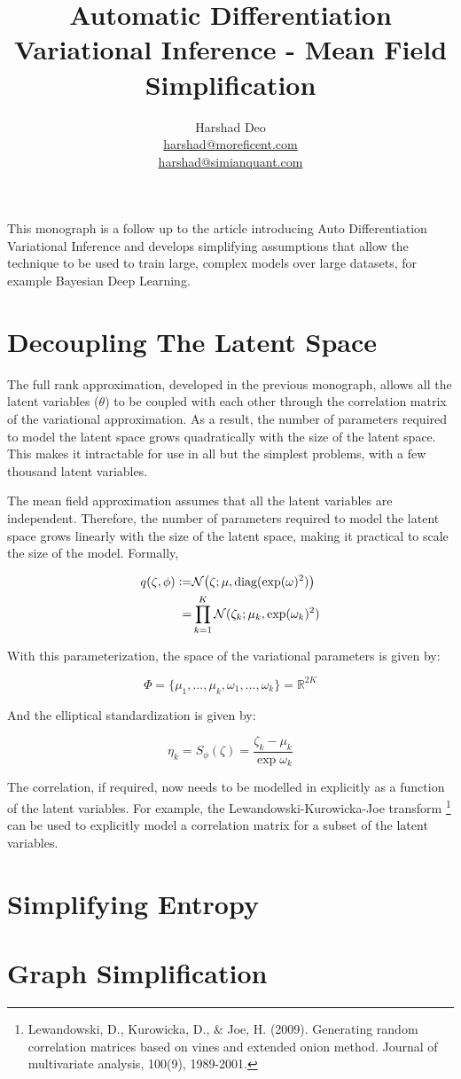 \documentclass[10pt]{article}
\title{Automatic Differentiation Variational Inference - Mean Field Simplification}
\author{Harshad Deo \\ 
  \href{mailto:harshad@moreficent.com}{harshad@moreficent.com} \\ 
  \href{mailto:harshad@simianquant.com}{harshad@simianquant.com}
}
\date{}
\newcommand{\defeq}{\vcentcolon=}
\begin{document}
  
\maketitle

This monograph is a follow up to the article introducing Auto Differentiation Variational Inference and develops simplifying
assumptions that allow the technique to be used to train large, complex models over large datasets, for example Bayesian 
Deep Learning.

\section*{Decoupling The Latent Space}

The full rank approximation, developed in the previous monograph, allows all the latent variables ($\theta$) to be coupled
with each other through the correlation matrix of the variational approximation. As a result, the number of parameters
required to model the latent space grows quadratically with the size of the latent space. This makes it intractable for 
use in all but the simplest problems, with a few thousand latent variables. 

The mean field approximation assumes that all the latent variables are independent. Therefore, the number of parameters
required to model the latent space grows linearly with the size of the latent space, making it practical to scale the size
of the model. Formally,

\begin{align*}
  q(\zeta, \phi) \defeq& \mathcal{N}\big(\zeta; \mu, \text{diag}(\exp(\omega) ^2)\big) \\
  =& \prod_{k=1}^K \mathcal{N}(\zeta_k; \mu_k, \exp(\omega_k)^2)
\end{align*}

With this parameterization, the space of the variational parameters is given by:

\begin{equation*}
  \Phi = \{\mu_1, \ldots, \mu_k, \omega_1, \ldots, \omega_k\} = \mathbb{R}^{2K}
\end{equation*}

And the elliptical standardization is given by:

\begin{equation*}
  \eta_k = S_{\phi}(\zeta) = \frac{\zeta_k - \mu_k}{\exp \omega_k}
\end{equation*}

The correlation, if required, now needs to be modelled in explicitly as a function of the latent variables. For example, 
the Lewandowski-Kurowicka-Joe transform \footnote{Lewandowski, D., Kurowicka, D., \& Joe, H. (2009). Generating random correlation matrices based on vines and extended onion method. Journal of multivariate analysis, 100(9), 1989-2001.} can be used to explicitly model a correlation matrix for a subset of the latent
variables. 

\section*{Simplifying Entropy}


\section*{Graph Simplification}
\end{document}
